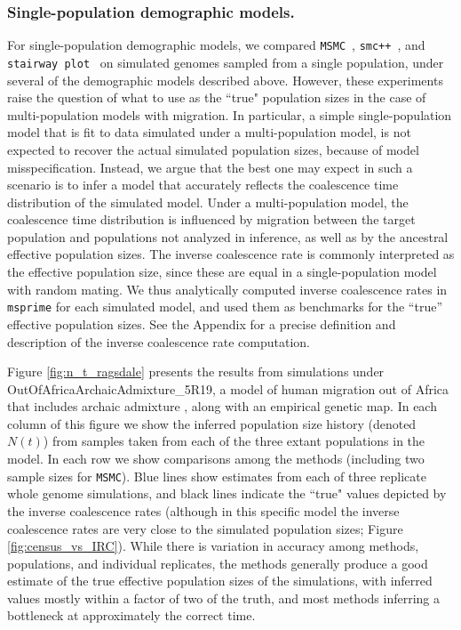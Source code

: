 \documentclass[12pt,halfline,a4paper]{ouparticle}
\newcommand{\MSMC}{\texttt{MSMC}\xspace}
\newcommand{\smcpp}{\texttt{smc++}\xspace}
\newcommand{\stairwayplot}{\texttt{stairway plot}\xspace}
\begin{document}
\subsubsection*{ Single-population demographic models.}
For single-population demographic models, we compared
\MSMC~\citep{schiffels2014inferring}, \smcpp~\citep{terhorst2017robust}, and
\stairwayplot~\citep{liu2015exploring}
 on simulated genomes sampled from a single population,
under several of the demographic models described above.
However, these experiments raise the question of what to use as the ``true" population sizes in the case of multi-population models with migration.
In particular, a simple single-population model that is fit to data simulated
under a multi-population model,
is not expected to recover the actual simulated population sizes,
because of model misspecification.
Instead, we argue that the best one may expect in such a scenario is to infer a model that accurately reflects the
coalescence time distribution of the simulated model.
Under a multi-population model, the coalescence time distribution is influenced by migration between the target population and populations not analyzed in inference,
as well as by the ancestral effective population sizes.
The inverse coalescence rate is commonly interpreted as the effective population size,
since these are equal in a single-population model with random mating.
We thus analytically computed inverse coalescence
rates in \texttt{msprime} for each simulated model, and used them as benchmarks for the ``true'' effective population sizes.
See the Appendix for a precise definition and description of the inverse coalescence rate computation.

Figure \ref{fig:n_t_ragsdale} presents the results
from simulations under OutOfAfricaArchaicAdmixture\_5R19,
a model of human migration out of Africa that includes archaic admixture
\citep{ragsdale2019models}, along with an empirical genetic map. In each column of this figure
we show the inferred population size history (denoted $N(t)$)
from samples taken from each of the three extant populations in the model.
In each row we show comparisons among the methods (including two sample sizes for \MSMC).
Blue lines show estimates from each of three replicate whole genome simulations,
and black lines indicate the ``true" values depicted by the inverse coalescence rates (although in this specific model
the inverse coalescence rates are very close to the simulated population sizes;
Figure \ref{fig:census_vs_IRC}).
While there is variation in accuracy among methods, populations, and individual replicates,
the methods generally produce a good estimate
of the true effective population sizes of the simulations, with
inferred values mostly within a factor of two of the truth,
and most methods inferring a bottleneck at approximately the correct time.
\end{document}
